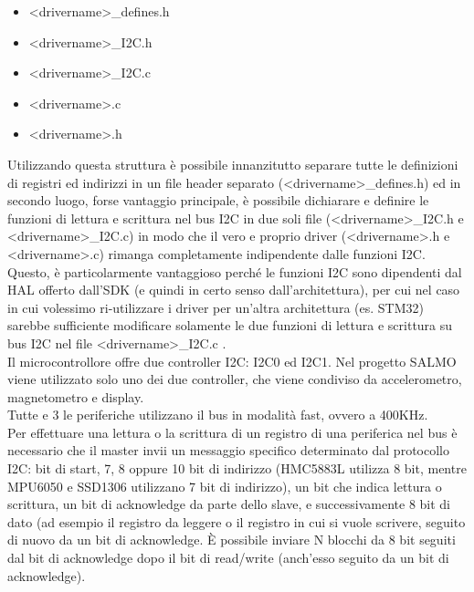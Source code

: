\begin{itemize}
\item
  
  \textless drivername\textgreater\_defines.h
  
\item
  
  \textless drivername\textgreater\_I2C.h
  
\item
  
  \textless drivername\textgreater\_I2C.c
  
\item
  
  \textless drivername\textgreater.c
  
\item
  
  \textless drivername\textgreater.h
  
\end{itemize}

\noindent Utilizzando questa struttura è possibile innanzitutto separare tutte le
definizioni di registri ed indirizzi in un file header separato
(\textless drivername\textgreater\_defines.h) ed in secondo luogo, forse
vantaggio principale, è possibile dichiarare e definire le funzioni di
lettura e scrittura nel bus I2C in due soli file
(\textless drivername\textgreater\_I2C.h e
\textless drivername\textgreater\_I2C.c) in modo che il vero e proprio
driver (\textless drivername\textgreater.h e
\textless drivername\textgreater.c) rimanga completamente indipendente
dalle funzioni I2C. Questo, è particolarmente vantaggioso perché le
funzioni I2C sono dipendenti dal HAL offerto dall'SDK (e quindi in certo
senso dall'architettura), per cui nel caso in cui volessimo
ri-utilizzare i driver per un'altra architettura (es. STM32) sarebbe
sufficiente modificare solamente le due funzioni di lettura e scrittura
su bus I2C nel file \textless drivername\textgreater\_I2C.c .\\
Il microcontrollore offre due controller I2C: I2C0 ed I2C1. Nel progetto
SALMO viene utilizzato solo uno dei due controller, che viene condiviso
da accelerometro, magnetometro e display.\\
Tutte e 3 le periferiche utilizzano il bus in modalità fast, ovvero a
400KHz.\\
Per effettuare una lettura o la scrittura di un registro di una
periferica nel bus è necessario che il master invii un messaggio
specifico determinato dal protocollo I2C: bit di start, 7, 8 oppure 10
bit di indirizzo (HMC5883L utilizza 8 bit, mentre MPU6050 e SSD1306
utilizzano 7 bit di indirizzo), un bit che indica lettura o scrittura,
un bit di acknowledge da parte dello slave, e successivamente 8 bit di
dato (ad esempio il registro da leggere o il registro in cui si vuole
scrivere, seguito di nuovo da un bit di acknowledge. È possibile inviare
N blocchi da 8 bit seguiti dal bit di acknowledge dopo il bit di
read/write (anch'esso seguito da un bit di acknowledge).

